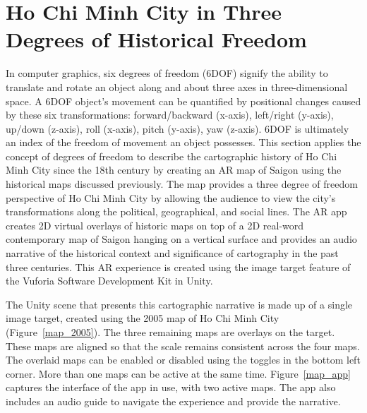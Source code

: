 \section{Ho Chi Minh City in Three Degrees of Historical Freedom}

In computer graphics, six degrees of freedom (6DOF) signify the ability to translate and rotate an object along and about three axes in three-dimensional space. A 6DOF object’s movement can be quantified by positional changes caused by these six transformations: forward/backward (x-axis), left/right (y-axis), up/down (z-axis), roll (x-axis), pitch (y-axis), yaw (z-axis). 6DOF is ultimately an index of the freedom of movement an object possesses. This section applies the concept of degrees of freedom to describe the cartographic history of Ho Chi Minh City since the 18th century by creating an AR map of Saigon using the historical maps discussed previously. The map provides a three degree of freedom perspective of Ho Chi Minh City by allowing the audience to view the city’s transformations along the political, geographical, and social lines. The AR app creates 2D virtual overlays of historic maps on top of a 2D real-word contemporary map of Saigon hanging on a vertical surface and provides an audio narrative of the historical context and significance of cartography in the past three centuries. This AR experience is created using the image target feature of the Vuforia Software Development Kit in Unity.

The Unity scene that presents this cartographic narrative is made up of a single image target, created using the 2005 map of Ho Chi Minh City (Figure~\ref{map_2005}). The three remaining maps are overlays on the target. These maps are aligned so that the scale remains consistent across the four maps. The overlaid maps can be enabled or disabled using the toggles in the bottom left corner. More than one maps can be active at the same time. Figure~\ref{map_app} captures the interface of the app in use, with two active maps. The app also includes an audio guide to navigate the experience and provide the narrative.
\en 

\begin{figure}[!ht]
\end{figure}

